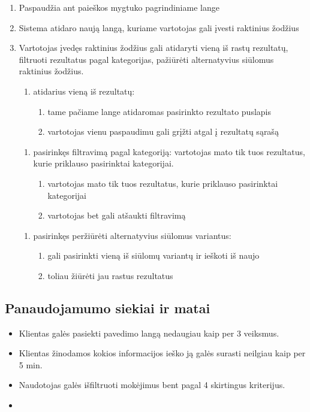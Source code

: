 \documentclass{VUMIFPSkursinis}
\begin{document}
\begin{enumerate}
	\item Paspaudžia ant paieškos mygtuko pagrindiniame lange
	\item Sistema atidaro naują langą, kuriame vartotojas gali įvesti raktinius žodžius
	\item Vartotojas įvedęs raktinius žodžius gali atidaryti vieną iš rastų rezultatų, filtruoti rezultatus pagal kategorijas, pažiūrėti alternatyvius siūlomus raktinius žodžius.
	\begin{enumerate}
		\item atidarius vieną iš rezultatų:
		\begin{enumerate}
			\item tame pačiame lange atidaromas pasirinkto rezultato puslapis
			\item vartotojas vienu paspaudimu gali grįžti atgal į rezultatų sąrašą
		\end{enumerate}
	\end{enumerate}
	\begin{enumerate}
		\item pasirinkęs filtravimą pagal kategoriją: vartotojas mato tik tuos rezultatus, kurie priklauso pasirinktai kategorijai.
		\begin{enumerate}
			\item vartotojas mato tik tuos rezultatus, kurie priklauso pasirinktai kategorijai
			\item vartotojas bet gali atšaukti filtravimą
		\end{enumerate}
	\end{enumerate}
	\begin{enumerate}
		\item pasirinkęs peržiūrėti alternatyvius siūlomus variantus:
		\begin{enumerate}
			\item gali pasirinkti vieną iš siūlomų variantų ir ieškoti iš naujo
			\item toliau žiūrėti jau rastus rezultatus
		\end{enumerate}
	\end{enumerate}
\end{enumerate}
\subsection{Panaudojamumo siekiai ir matai}
\begin{itemize}
	\item Klientas galės pasiekti pavedimo langą nedaugiau kaip per 3 veiksmus.
	\item Klientas žinodamos kokios informacijos ieško ją galės surasti neilgiau kaip per 5 min.
	\item Naudotojas galės išfiltruoti mokėjimus bent pagal 4 skirtingus kriterijus.
	\item 
\end{itemize}
\pagebreak
\end{document}
